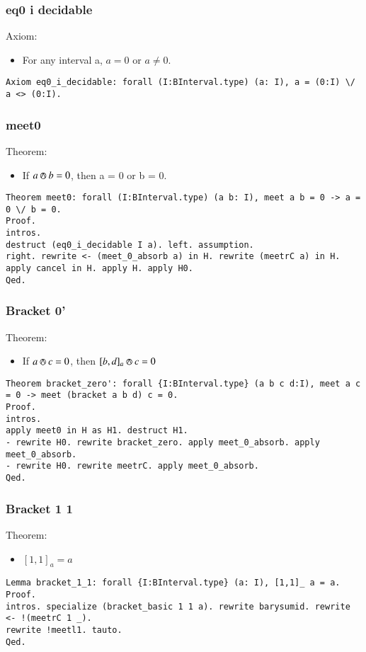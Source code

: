 \documentclass[a4paper,10pt]{article} %
\newcommand{\meet}{\circledwedge}
\begin{document}
\subsubsection{eq0 i decidable}
Axiom:
\begin{itemize}
    \item For any interval a, $a = 0$ or $a \neq 0$.
\end{itemize}
\begin{lstlisting}
Axiom eq0_i_decidable: forall (I:BInterval.type) (a: I), a = (0:I) \/ a <> (0:I).
\end{lstlisting}

\subsubsection{meet0}
Theorem:
\begin{itemize}
    \item If $a \meet b = 0$, then a = 0 or b = 0.
\end{itemize}
\begin{lstlisting}
Theorem meet0: forall (I:BInterval.type) (a b: I), meet a b = 0 -> a = 0 \/ b = 0.
Proof.
intros.
destruct (eq0_i_decidable I a). left. assumption.
right. rewrite <- (meet_0_absorb a) in H. rewrite (meetrC a) in H. 
apply cancel in H. apply H. apply H0.
Qed.
\end{lstlisting}

\subsubsection{Bracket 0'}
Theorem:
\begin{itemize}
    \item If $a \meet c = 0$, then $[b, d]_a \meet c = 0$
\end{itemize}
\begin{lstlisting}
Theorem bracket_zero': forall {I:BInterval.type} (a b c d:I), meet a c = 0 -> meet (bracket a b d) c = 0.
Proof.
intros.
apply meet0 in H as H1. destruct H1. 
- rewrite H0. rewrite bracket_zero. apply meet_0_absorb. apply meet_0_absorb.
- rewrite H0. rewrite meetrC. apply meet_0_absorb.
Qed.
\end{lstlisting}

\subsubsection{Bracket 1 1}
Theorem:
\begin{itemize}
    \item $[1, 1]_a = a$
\end{itemize}
\begin{lstlisting}
Lemma bracket_1_1: forall {I:BInterval.type} (a: I), [1,1]_ a = a.
Proof.
intros. specialize (bracket_basic 1 1 a). rewrite barysumid. rewrite <- !(meetrC 1 _).
rewrite !meetl1. tauto.
Qed.
\end{lstlisting}
\end{document}

